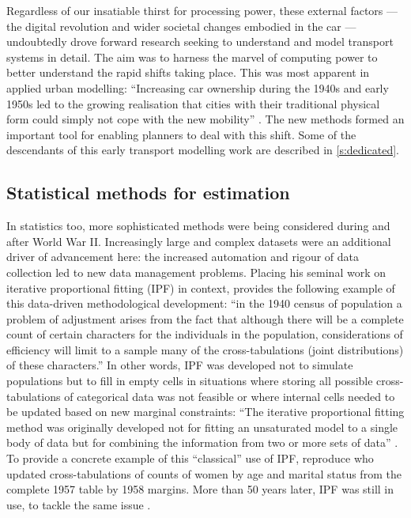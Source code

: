\documentclass[a4paper, 11pt, twoside]{Thesis}
\begin{document}
Regardless of our insatiable thirst for processing power, these external factors
--- the digital revolution and wider societal changes embodied in the
car --- undoubtedly drove forward research seeking to understand and model
transport systems in detail. The aim was to harness the marvel of computing
power to better understand the rapid shifts taking place.
This was most apparent in applied urban modelling: ``Increasing car
ownership during the 1940s and early 1950s led to the growing realisation
that cities with their traditional physical form could simply not cope
with the new mobility'' \citep[p.~6]{batty1976urban}. The new methods formed an
important tool for enabling planners to deal with this shift.
Some of the descendants of this early transport modelling work are described in
\cref{s:dedicated}.

\subsection{Statistical methods for estimation}
In statistics too, more
sophisticated methods were being considered during and after World War II.
Increasingly large and complex
datasets were an additional driver of advancement here: the increased automation
and rigour of data collection led to new data management
problems. Placing his seminal work on iterative proportional fitting (IPF) in
context, \citet[p.~427]{Deming1940} provides the following example of this
data-driven methodological development:
``in the 1940 census of population a problem of adjustment arises from the fact
that although there will be a complete count of certain characters for the
individuals in the population, considerations of efficiency will limit to a
sample many of the cross-tabulations (joint distributions) of these
characters.'' In other words, IPF was developed not to simulate populations but
to fill in empty cells in situations where storing all possible cross-tabulations of
categorical data was not feasible or where internal cells needed to be
updated based on new marginal constraints:
``The iterative proportional fitting method was originally
developed not for fitting
an unsaturated model to a single body of data but for combining the information
from two or more sets of data'' \citep[p.~97]{bishop2007discrete}. To provide a
concrete example of this ``classical'' use of IPF, \citet{bishop2007discrete}
reproduce \citet{Friedlander1961-ipf} who updated cross-tabulations of
counts of women by age and marital status from the complete 1957 table by 1958
margins. More than 50 years later, IPF was still in use, to
tackle the same issue \citep{Jirousek1995}.
\end{document}

